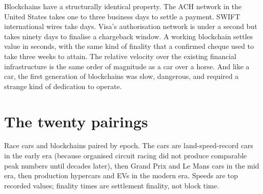 \documentclass[11pt,a4paper]{article}
\begin{document}
Blockchains have a structurally identical property. The ACH network in
the United States takes one to three business days to settle a payment.
SWIFT international wires take days. Visa's authorisation network is
under a second but takes ninety days to finalise a chargeback window. A
working blockchain settles value in seconds, with the same kind of
finality that a confirmed cheque used to take three weeks to attain.
The relative velocity over the existing financial infrastructure is the
same order of magnitude as a car over a horse. And like a car, the
first generation of blockchains was slow, dangerous, and required a
strange kind of dedication to operate.

\section{The twenty pairings}

Race cars and blockchains paired by epoch. The cars are land-speed-record
cars in the early era (because organised circuit racing did not produce
comparable peak numbers until decades later), then Grand Prix and Le
Mans cars in the mid era, then production hypercars and EVs in the
modern era. Speeds are top recorded values; finality times are settlement
finality, not block time.
\end{document}

